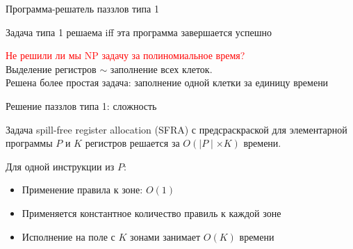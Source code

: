 \documentclass[aspectratio=169
  , xcolor={svgnames}
  , hyperref={ colorlinks,citecolor=DeepPink4
             , linkcolor=DarkRed,urlcolor=DarkBlue}
  , russian
  ]{beamer}
\theoremstyle{exerciseStyle1}
\begin{document}
\begin{frame}[fragile]{Программа-решатель паззлов типа 1}
\begin{minipage}{.48\textwidth}
\begin{theorem}
Задача типа 1 решаема iff эта программа завершается успешно
\end{theorem}

\textcolor{red}{Не решили ли мы  NP задачу за полиномиальное время?}\\


Выделение регистров $\sim$ заполнение всех клеток.\\

Решена более простая задача: заполнение одной клетки за единицу времени
\end{minipage}
\end{frame}



\begin{frame}[fragile]{Решение паззлов типа  1: сложность}
\begin{theorem}
Задача spill-free register allocation (SFRA) с предсраскраской
для элементарной программы $P$ и $K$ регистров решается за $O(\mid\!P\!\mid \times K)$ времени.
\end{theorem}
Для одной инструкции из $P$:
\begin{itemize}
\item Применение правила к зоне: $O(1)$
\item Применяется константное количество правиль к каждой зоне
\item Исполнение на поле с $K$ зонами занимает $O(K)$ времени
\end{itemize}
\end{frame}
\end{document}
